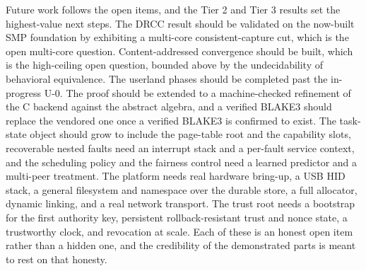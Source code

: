 \documentclass[10pt,twocolumn]{article}
\begin{document}
Future work follows the open items, and the Tier 2 and Tier 3 results set the
highest-value next steps. The DRCC result should be validated on the now-built SMP
foundation by exhibiting a multi-core consistent-capture cut, which is the open
multi-core question. Content-addressed convergence should be built, which is the
high-ceiling open question, bounded above by the undecidability of behavioral
equivalence. The userland phases should be completed past the in-progress U-0. The
proof should be extended to a machine-checked refinement of the C backend against
the abstract algebra, and a verified BLAKE3 should replace the vendored one once a
verified BLAKE3 is confirmed to exist. The task-state object should grow to include
the page-table root and the capability slots, recoverable nested faults need an
interrupt stack and a per-fault service context, and the scheduling policy and the
fairness control need a learned predictor and a multi-peer treatment. The platform
needs real hardware bring-up, a USB HID stack, a general filesystem and namespace
over the durable store, a full allocator, dynamic linking, and a real network
transport. The trust root needs a bootstrap for the first authority key, persistent
rollback-resistant trust and nonce state, a trustworthy clock, and revocation at
scale. Each of these is an honest open item rather than a hidden one, and the
credibility of the demonstrated parts is meant to rest on that honesty.
\end{document}
